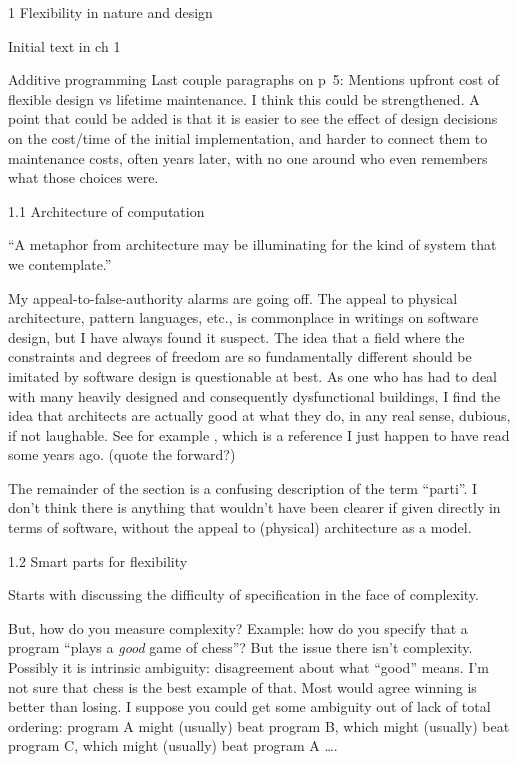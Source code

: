 \documentclass[12pt]{PalisadesLakesBook}
\begin{document}
\begin{plSection}{}
\begin{plSection}{1 Flexibility in nature and design}
\begin{plSection}{Initial text in ch 1}
\begin{plSection}{Additive programming}
Last couple paragraphs on p~5:
Mentions upfront cost of flexible design vs
lifetime maintenance.
I think this could be strengthened.
A point that could be added is that 
it is easier to see the effect of design decisions 
on the cost/time of the initial implementation,
and harder to connect them to maintenance costs, 
often years later, with no one around who even remembers 
what those choices were. 

\end{plSection}%
\end{plSection}%
\begin{plSection}{1.1 Architecture of computation}

``A metaphor from architecture may be illuminating for the kind
of system that we contemplate.''

My appeal-to-false-authority alarms are going off.
The appeal to physical architecture, pattern languages, etc.,
is commonplace in writings on software design,
but I have always found it suspect.
The idea that a field 
where the constraints and degrees of freedom
are so fundamentally different should be imitated 
by software design is questionable at best.
As one who has had to deal with many heavily designed
and consequently dysfunctional buildings,
I find the idea that architects are actually good at what they do,
in any real sense, dubious, if not laughable.
See for example ,
which is a reference I just happen to have read some years ago.
(\TODO quote the forward?)

The remainder of the section is a confusing description 
of the term ``parti''.
I don't think there is anything that wouldn't have been 
clearer if given directly in terms of software,
without the appeal to (physical) architecture as a model. 

\end{plSection}%
\begin{plSection}{1.2 Smart parts for flexibility}

Starts with discussing the difficulty of specification
in the face of complexity. 

But, how do you measure complexity?
Example: how do you specify that a program
``plays a \emph{good} game of chess''?
But the issue there isn't complexity.
Possibly it is intrinsic ambiguity: disagreement about what
``good'' means.
I'm not sure that chess is the best example of that.
Most would agree winning is better than losing.
I suppose you could get some ambiguity out of lack of
total ordering: 
program A might (usually) beat program B,
which might (usually) beat program C, 
which might (usually) beat program A {\ldots}.


\end{plSection}
\end{plSection}
\end{plSection}
\end{document}
